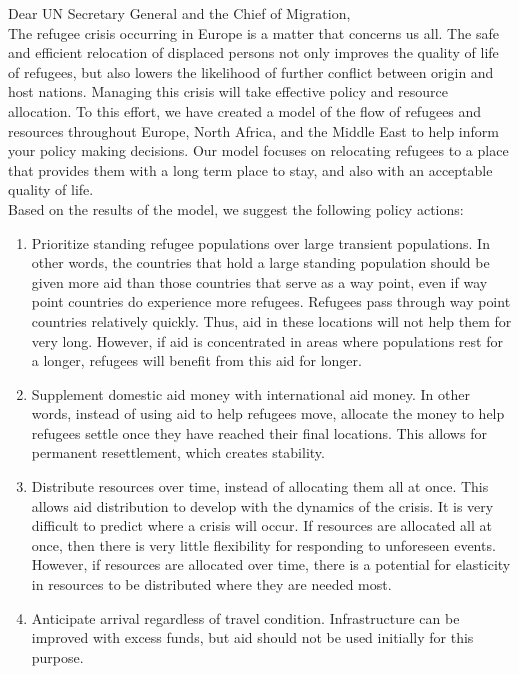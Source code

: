 \documentclass{article}
\begin{document}
\pagebreak

\noindent Dear UN Secretary General and the Chief of Migration,\\

The refugee crisis occurring in Europe is a matter that concerns us all. The safe and efficient relocation of displaced persons not only improves the quality of life of refugees, but also lowers the likelihood of further conflict between origin and host nations. 
Managing this crisis will take effective policy and resource allocation. To this effort, we have created a model of the flow of refugees and resources throughout Europe, North Africa, and the Middle East to help inform your policy making decisions. Our model focuses on relocating refugees to a place that provides them with a long term place to stay, and also with an acceptable quality of life.\\
Based on the results of the model, we suggest the following policy actions:
\begin{enumerate}
    \item Prioritize standing refugee populations over large transient populations. In other words, the countries that hold a large standing population should be given more aid than those countries that serve as a way point, even if way point countries do experience more refugees. Refugees pass through way point countries relatively quickly. Thus, aid in these locations will not help them for very long. However, if aid is concentrated in areas where populations rest for a longer, refugees will benefit from this aid for longer. 
    \item Supplement domestic aid money with international aid money. In other words, instead of using aid to help refugees move, allocate the money to help refugees settle once they have reached their final locations. This allows for permanent resettlement, which creates stability.
    \item Distribute resources over time, instead of allocating them all at once. This allows aid distribution to develop with the dynamics of the crisis. It is very difficult to predict where a crisis will occur. If resources are allocated all at once, then there is very little flexibility for responding to unforeseen events. However, if resources are allocated over time, there is a potential for elasticity in resources to be distributed where they are needed most.
    \item Anticipate arrival regardless of travel condition. Infrastructure can be improved with excess funds, but aid should not be used initially for this purpose. 
\end{enumerate}
\end{document}
